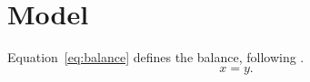 \documentclass{article}
\begin{document}
\section{Model}\label{sec:model}
Equation~\eqref{eq:balance} defines the balance, following \cite{smith2025}.
\begin{equation}\label{eq:balance}
  x = y.
\end{equation}


\end{document}
